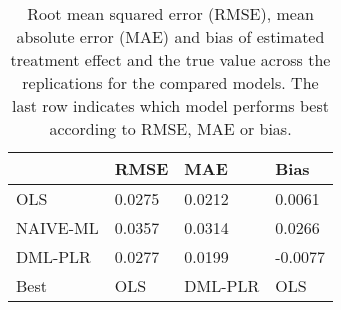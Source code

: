 \begin{table}[H]
\centering
\caption{Root mean squared error (RMSE), mean absolute error (MAE) and bias of estimated treatment effect and the true value across the replications for the compared models. The last row indicates which model performs best according to RMSE, MAE or bias.}
\label{Scenario1}
\begin{tabular}{L{3.3333333333333335cm}L{2.6666666666666665cm}R{2.0cm}R{2.6666666666666665cm}}
\toprule
 & RMSE & MAE & Bias \\
\midrule
OLS & 0.0275 & 0.0212 & 0.0061 \\
NAIVE-ML & 0.0357 & 0.0314 & 0.0266 \\
DML-PLR & 0.0277 & 0.0199 & -0.0077 \\
Best & OLS & DML-PLR & OLS \\
\bottomrule
\end{tabular}
\end{table}
